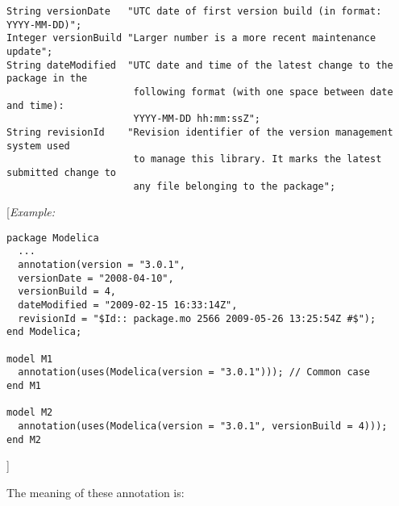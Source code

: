 \begin{lstlisting}[language=modelica]
String versionDate   "UTC date of first version build (in format: YYYY-MM-DD)";
Integer versionBuild "Larger number is a more recent maintenance update";
String dateModified  "UTC date and time of the latest change to the package in the
                      following format (with one space between date and time):
                      YYYY-MM-DD hh:mm:ssZ";
String revisionId    "Revision identifier of the version management system used
                      to manage this library. It marks the latest submitted change to
                      any file belonging to the package";
\end{lstlisting}
{[}\emph{Example:}

\begin{lstlisting}[language=modelica]
package Modelica
  ...
  annotation(version = "3.0.1",
  versionDate = "2008-04-10",
  versionBuild = 4,
  dateModified = "2009-02-15 16:33:14Z",
  revisionId = "$Id:: package.mo 2566 2009-05-26 13:25:54Z #$");
end Modelica;

model M1
  annotation(uses(Modelica(version = "3.0.1"))); // Common case
end M1

model M2
  annotation(uses(Modelica(version = "3.0.1", versionBuild = 4)));
end M2
\end{lstlisting}
{]}

The meaning of these annotation is:

